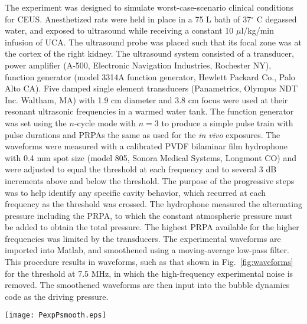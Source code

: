 \documentclass[%
preprint,%
author-year,%
]{jasatex}
\begin{document}
The experiment was designed to simulate worst-case-scenario clinical conditions 
for CEUS. Anesthetized rats were held in place in a 75 L bath of 37$ ^\circ$ C 
degassed water, and exposed to ultrasound while receiving a constant 10 $\mu$l/kg/min 
infusion of UCA.  The ultrasound probe was placed such that its focal zone was at the 
cortex of the right kidney.  The ultrasound system consisted of a transducer, power 
amplifier (A-500, Electronic Navigation Industries, Rochester NY),
function generator (model 3314A function generator, Hewlett Packard
Co., Palo Alto CA).  Five damped single element transducers
(Panametrics, Olympus NDT Inc. Waltham, MA) with 1.9 cm diameter and
3.8 cm focus were used at their resonant ultrasonic frequencies in a
warmed water tank.  The function generator was set using the $n$-cycle
mode with $n=3$ to produce a simple pulse train with pulse durations
and PRPAs the same as used for the \textit{in vivo} exposures.  The waveforms
were measured with a calibrated PVDF bilaminar film hydrophone with
0.4 mm spot size (model 805, Sonora Medical Systems, Longmont CO) and
were adjusted to equal the threshold at each frequency and to several
3 dB increments above and below the threshold.  The purpose of the
progressive steps was to help identify any specific cavity behavior,
which recurred at each frequency as the threshold was crossed.  The
hydrophone measured the alternating pressure including the PRPA, to
which the constant atmospheric pressure must be added
to obtain the total pressure.  The highest PRPA available for the
higher frequencies was limited by the transducers.  The experimental
waveforms are imported into Matlab, and smoothened using a
moving-average low-pass filter. This procedure results in waveforms,
such as that shown in Fig.~\ref{fig:waveforms} for the threshold at
7.5 MHz, in which the high-frequency experimental noise is
removed. The smoothened waveforms are then input into the bubble
dynamics code as the driving pressure.

\begin{figure*}[!t]
  \centering \texttt{[image: PexpPsmooth.eps]}
  \caption{(color online) Experimental and numerical (filtered) pressure waveforms for the
    7.5 MHz pulse at the threshold (Peak negative pressure: 6.0 MPa, 543 ns duration, 
  MI$_{eq}$=PRPA/$f^{1/2}$=2.2). Solid: experimental; dashed: numerical.}
  \label{fig:waveforms}
\end{figure*}
\end{document}
